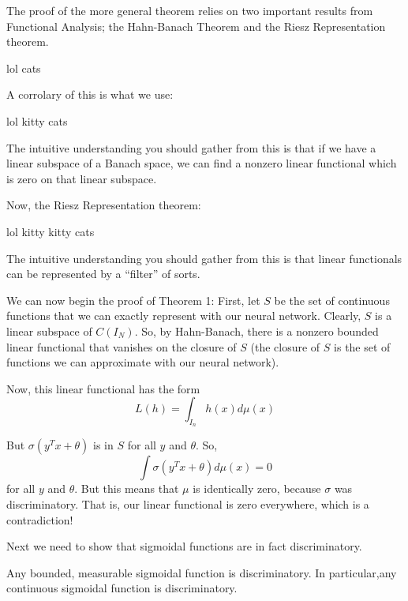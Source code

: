 \documentclass[11pt,letterpaper]{beamer}
\begin{document}
\begin{frame}
  The proof of the more general theorem relies on two important results from
  Functional Analysis; the Hahn-Banach Theorem and the Riesz Representation
  theorem.

  \begin{theorem}
    lol cats 
  \end{theorem}
  A corrolary of this is what we use:

  \begin{theorem}
    lol kitty cats
  \end{theorem}

  The intuitive understanding you should gather from this is that if we have a
  linear subspace of a Banach space, we can find a nonzero linear functional which is
  zero on that linear subspace.
\end{frame}

\begin{frame}
  Now, the Riesz Representation theorem:
  \begin{theorem}
    lol kitty kitty cats
  \end{theorem}
 The intuitive understanding you should gather from this is that linear
 functionals can be represented by a ``filter'' of sorts. 
\end{frame}

\begin{frame}
  We can now begin the proof of Theorem 1:
  First, let $S$ be the set of continuous functions that we can exactly
  represent with our neural network. Clearly, $S$ is a linear subspace of
  $C(I_N)$. So, by Hahn-Banach, there is a nonzero bounded linear functional
  that vanishes on the closure of $S$ (the closure of $S$ is the set of
  functions we can approximate with our neural network). 
\end{frame}

\begin{frame}
  Now, this linear functional has the form
  \[
L(h) = \int_{I_n} h(x) d\mu(x)
\]

But $\sigma(y^T x + \theta)$ is in $S$ for all $y$ and $\theta$. So,
\[
\int \sigma(y^Tx + \theta) d \mu(x) = 0
\]
 for all $y$ and $\theta$. But this means that $\mu$ is identically zero,
 because $\sigma$ was discriminatory. That is, our linear functional is zero
 everywhere, which is a contradiction!
\end{frame}

\begin{frame}
  Next we need to show that sigmoidal functions are in fact discriminatory.
  \begin{lemma}
    Any bounded, measurable sigmoidal function is discriminatory. In
    particular,any continuous sigmoidal function is discriminatory.
  \end{lemma}
\end{frame}
\end{document}
